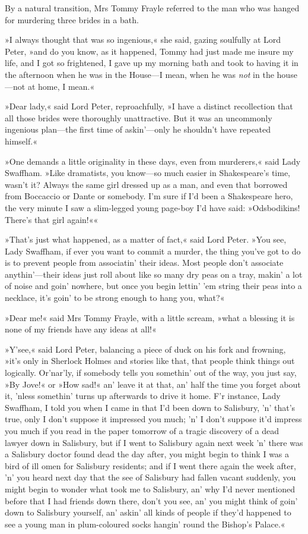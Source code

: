 By a natural transition, Mrs Tommy Frayle referred to the man who was hanged for murdering three brides in a bath.

»I always thought that was so ingenious,« she said, gazing soulfully at Lord Peter, »and do you know, as it happened, Tommy had just made me insure my life, and I got so frightened, I gave up my morning bath and took to having it in the afternoon when he was in the House—I mean, when he was \textit{not} in the house—not at home, I mean.«

»Dear lady,« said Lord Peter, reproachfully, »I have a distinct recollection that all those brides were thoroughly unattractive. But it was an uncommonly ingenious plan—the first time of askin'---only he shouldn't have repeated himself.«

»One demands a little originality in these days, even from murderers,« said Lady Swaffham. »Like dramatists, you know—so much easier in Shakespeare's time, wasn't it? Always the same girl dressed up as a man, and even that borrowed from Boccaccio or Dante or somebody. I'm sure if I'd been a Shakespeare hero, the very minute I saw a slim-legged young page-boy I'd have said: »Odsbodikins! There's that girl again!««

»That's just what happened, as a matter of fact,« said Lord Peter. »You see, Lady Swaffham, if ever you want to commit a murder, the thing you've got to do is to prevent people from associatin' their ideas. Most people don't associate anythin'---their ideas just roll about like so many dry peas on a tray, makin' a lot of noise and goin' nowhere, but once you begin lettin' 'em string their peas into a necklace, it's goin' to be strong enough to hang you, what?«

»Dear me!« said Mrs Tommy Frayle, with a little scream, »what a blessing it is none of my friends have any ideas at all!«

»Y'see,« said Lord Peter, balancing a piece of duck on his fork and frowning, »it's only in Sherlock Holmes and stories like that, that people think things out logically. Or'nar'ly, if somebody tells you somethin' out of the way, you just say, »By Jove!« or »How sad!« an' leave it at that, an' half the time you forget about it, 'nless somethin' turns up afterwards to drive it home. F'r instance, Lady Swaffham, I told you when I came in that I'd been down to Salisbury, 'n' that's true, only I don't suppose it impressed you much; 'n' I don't suppose it'd impress you much if you read in the paper tomorrow of a tragic discovery of a dead lawyer down in Salisbury, but if I went to Salisbury again next week 'n' there was a Salisbury doctor found dead the day after, you might begin to think I was a bird of ill omen for Salisbury residents; and if I went there again the week after, 'n' you heard next day that the see of Salisbury had fallen vacant suddenly, you might begin to wonder what took me to Salisbury, an' why I'd never mentioned before that I had friends down there, don't you see, an' you might think of goin' down to Salisbury yourself, an' askin' all kinds of people if they'd happened to see a young man in plum-coloured socks hangin' round the Bishop's Palace.«

